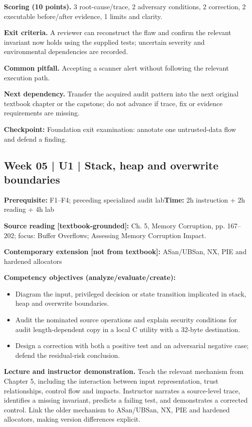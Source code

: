 \documentclass[10pt,letterpaper]{article}
\begin{document}
\textbf{Scoring (10 points).} 3 root-cause/trace, 2 adversary conditions, 2 correction, 2 executable before/after evidence, 1 limits and clarity.

\textbf{Exit criteria.} A reviewer can reconstruct the flaw and confirm the relevant invariant now holds using the supplied tests; uncertain severity and environmental dependencies are recorded.

\textbf{Common pitfall.} Accepting a scanner alert without following the relevant execution path.

\textbf{Next dependency.} Transfer the acquired audit pattern into the next original textbook chapter or the capstone; do not advance if trace, fix or evidence requirements are missing.

\begin{historynote}\textbf{Checkpoint:} Foundation exit examination: annotate one untrusted-data flow and defend a finding.\end{historynote}
\subsection{Week 05 | U1 | Stack, heap and overwrite boundaries}
\textbf{Prerequisite:} F1--F4; preceding specialized audit lab\hfill\textbf{Time:} 2h instruction + 2h reading + 4h lab

\textbf{Source reading [textbook-grounded]:} Ch. 5, Memory Corruption, pp. 167--202; focus: Buffer Overflows; Assessing Memory Corruption Impact.

\textbf{Contemporary extension [not from textbook]:} ASan/UBSan, NX, PIE and hardened allocators

\textbf{Competency objectives (analyze/evaluate/create):}
\begin{itemize}[leftmargin=*,itemsep=2pt]
\item Diagram the input, privileged decision or state transition implicated in stack, heap and overwrite boundaries.
\item Audit the nominated source operations and explain security conditions for audit length-dependent copy in a local C utility with a 32-byte destination.
\item Design a correction with both a positive test and an adversarial negative case; defend the residual-risk conclusion.
\end{itemize}
\textbf{Lecture and instructor demonstration.} Teach the relevant mechanism from Chapter 5, including the interaction between input representation, trust relationships, control flow and impacts. Instructor narrates a source-level trace, identifies a missing invariant, predicts a failing test, and demonstrates a corrected control. Link the older mechanism to ASan/UBSan, NX, PIE and hardened allocators, making version differences explicit.
\end{document}
